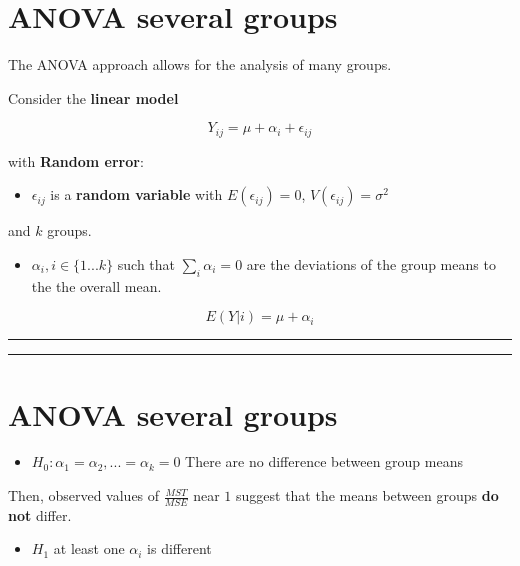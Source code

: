 \documentclass[
]{book}
\providecommand{\tightlist}{%
  \setlength{\itemsep}{0pt}\setlength{\parskip}{0pt}}
\begin{document}
\hypertarget{anova-several-groups}{%
\section{ANOVA several groups}\label{anova-several-groups}}

The ANOVA approach allows for the analysis of many groups.

Consider the \textbf{linear model}

\[Y_{ij} = \mu + \alpha_i +\epsilon_{ij}\]

with \textbf{Random error}:

\begin{itemize}
\tightlist
\item
  \(\epsilon_{ij}\) is a \textbf{random variable} with \(E(\epsilon_{ij})=0\), \(V(\epsilon_{ij})=\sigma^2\)
\end{itemize}

and \(k\) groups.

\begin{itemize}
\tightlist
\item
  \(\alpha_i, i \in\{1...k\}\) such that \(\sum_i \alpha_i=0\) are the deviations of the group means to the the overall mean.
\end{itemize}

\[E(Y|i)=\mu + \alpha_i\]

\begin{center}\rule{0.5\linewidth}{0.5pt}\end{center}

\begin{center}\rule{0.5\linewidth}{0.5pt}\end{center}

\hypertarget{anova-several-groups-1}{%
\section{ANOVA several groups}\label{anova-several-groups-1}}

\begin{itemize}
\tightlist
\item
  \(H_0: \alpha_1=\alpha_2, ...=\alpha_k=0\) There are no difference between group means
\end{itemize}

Then, observed values of \(\frac{MST}{MSE}\) near \(1\) suggest that the means between groups \textbf{do not} differ.

\begin{itemize}
\tightlist
\item
  \(H_1\) at least one \(\alpha_i\) is different
\end{itemize}
\end{document}
